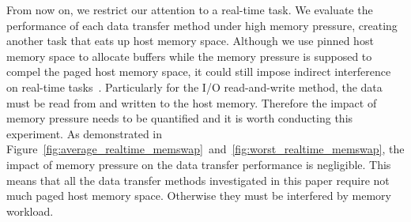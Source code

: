 From now on, we restrict our attention to a real-time task.
We evaluate the performance of each data transfer method under high
memory pressure, creating another task that eats up host memory space.
Although we use pinned host memory space to allocate buffers while the
memory pressure is supposed to compel the paged host memory space, it
could still impose indirect interference on real-time
tasks~\cite{Kato_RTSJ11, Yang_OSDI08}.
Particularly for the I/O read-and-write method, the data must be read
from and written to the host memory.
Therefore the impact of memory pressure needs to be quantified and it is
worth conducting this experiment.
As demonstrated in
Figure~\ref{fig:average_realtime_memswap}~and~\ref{fig:worst_realtime_memswap},
the impact of memory pressure on the data transfer performance is
negligible.
This means that all the data transfer methods investigated in this paper
require not much paged host memory space.
Otherwise they must be interfered by memory workload.

